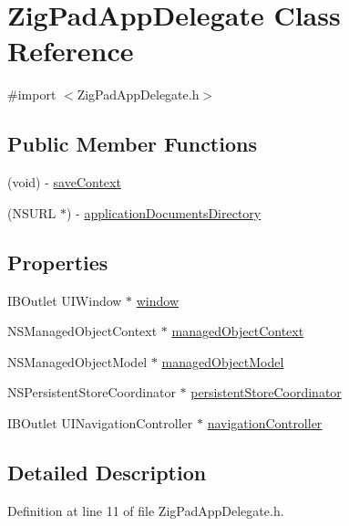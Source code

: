 \hypertarget{interface_zig_pad_app_delegate}{
\section{ZigPadAppDelegate Class Reference}
\label{interface_zig_pad_app_delegate}
}


{\ttfamily \#import $<$ZigPadAppDelegate.h$>$}

\subsection*{Public Member Functions}
\begin{DoxyCompactItemize}
\item 
(void) -\/ \hyperlink{interface_zig_pad_app_delegate_a8decfc0175ef3ecc9571f52ec9eb1fc7}{saveContext}
\item 
(NSURL $\ast$) -\/ \hyperlink{interface_zig_pad_app_delegate_a13f63ca0981501b3ae86e9931049c2f9}{applicationDocumentsDirectory}
\end{DoxyCompactItemize}
\subsection*{Properties}
\begin{DoxyCompactItemize}
\item 
IBOutlet UIWindow $\ast$ \hyperlink{interface_zig_pad_app_delegate_a055d472434a4ee0b915c207957a400e1}{window}
\item 
NSManagedObjectContext $\ast$ \hyperlink{interface_zig_pad_app_delegate_adeebe5deeb50f760daa2b23db0a20d95}{managedObjectContext}
\item 
NSManagedObjectModel $\ast$ \hyperlink{interface_zig_pad_app_delegate_a351b86d68f8de51693578d7a822ab420}{managedObjectModel}
\item 
NSPersistentStoreCoordinator $\ast$ \hyperlink{interface_zig_pad_app_delegate_a0a0142fa9c72a6dff5aad52371563234}{persistentStoreCoordinator}
\item 
IBOutlet UINavigationController $\ast$ \hyperlink{interface_zig_pad_app_delegate_ac9e552549e66f8099eb374aa8afc8dc5}{navigationController}
\end{DoxyCompactItemize}


\subsection{Detailed Description}


Definition at line 11 of file ZigPadAppDelegate.h.



